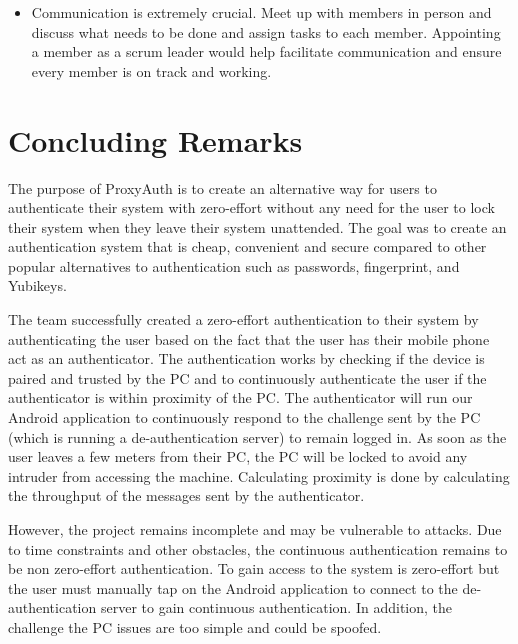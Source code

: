 \documentclass[letterpaper,twocolumn,10pt]{article}
\begin{document}
{{\begin{singlespacing}
\begin{itemize}
\item Communication is extremely crucial. Meet up with members in person and discuss what needs to be done and assign tasks to each member. Appointing a member as a scrum leader would help facilitate communication and ensure every member is on track and working.
\end{itemize}
\end{singlespacing}
\label{Section 6.3}

\section{Concluding Remarks}

The purpose of ProxyAuth is to create an alternative way for users to authenticate their system with zero-effort without any need for the user to lock their system when they leave their system unattended. The goal was to create an authentication system that is cheap, convenient and secure compared to other popular alternatives to authentication such as passwords, fingerprint, and Yubikeys.

The team successfully created a zero-effort authentication to their system by authenticating the user based on the fact that the user has their mobile phone act as an authenticator. The authentication works by checking if the device is paired and trusted by the PC and to continuously authenticate the user if the authenticator is within proximity of the PC. The authenticator will run our Android application to continuously respond to the challenge sent by the PC (which is running a de-authentication server) to remain logged in. As soon as the user leaves a few meters from their PC, the PC will be locked to avoid any intruder from accessing the machine. Calculating proximity is done by calculating the throughput of the messages sent by the authenticator. 

However, the project remains incomplete and may be vulnerable to attacks. Due to time constraints and other obstacles, the continuous authentication remains to be non zero-effort authentication. To gain access to the system is zero-effort but the user must manually tap on the Android application to connect to the de-authentication server to gain continuous authentication. In addition, the challenge the PC issues are too simple and could be spoofed.

}}
\end{document}

